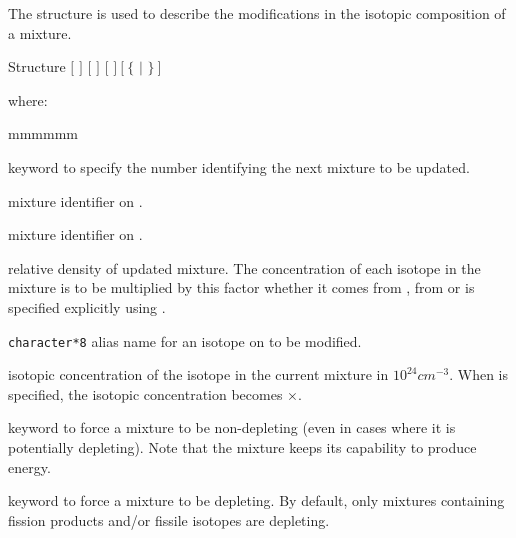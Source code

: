 \vskip 0.25cm
\goodbreak

The structure  is used to describe the modifications in the isotopic composition of a mixture.

\begin{DataStructure}{Structure }
   $[$  $]$ $[$  $]$
$[$   $]~[~\{$  $|$  $\}~]$
\end{DataStructure}

\noindent
where:

\begin{ListeDeDescription}{mmmmmm}

\item[\moc{MIX}] keyword to specify the number identifying the next mixture to
be updated.

\item[\dusa{matnum}] mixture identifier on . 

\item[\dusa{matold}] mixture identifier on .

\item[\dusa{relden}] relative density of updated mixture. The  concentration
of each isotope in the mixture is to be multiplied by this factor whether it 
comes from , from  or is
specified explicitly using . 

\item[\dusa{NAMALI}] {\tt character*8} alias name for an isotope on
 to be modified. 

\item[\dusa{dens}] isotopic concentration of the isotope  in the
current mixture in $10^{24}cm^{-3}$.  When  is specified, the
isotopic concentration becomes $\times$.

\item[\moc{NOEV}] keyword to force a mixture to be non-depleting (even in
cases where it is potentially depleting). Note that the mixture keeps its
capability to produce energy.

\item[\moc{EVOL}] keyword to force a mixture to be depleting. By default, only
mixtures containing fission products and/or fissile isotopes are depleting.

\end{ListeDeDescription}

\vskip 0.2cm

